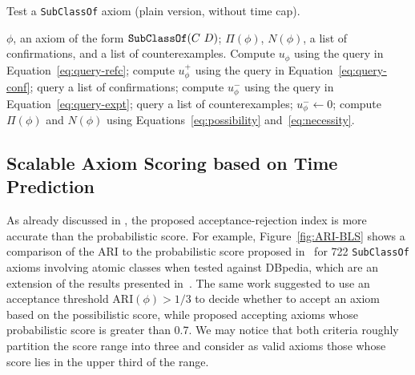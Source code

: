\documentclass{sig-alternate}
\begin{document}
\begin{algorithm}
\caption{Test a \texttt{SubClassOf} axiom\hfill\break
  (plain version, without time cap).}\label{algo:uncapped-axiom-test}
\begin{algorithmic}[1]
  \REQUIRE $\phi$, an axiom of the form $\mbox{\tt SubClassOf}(C\ D)$;
  \ENSURE $\Pi(\phi)$, $N(\phi)$, a list of confirmations, and a list of counterexamples.
  \STATE Compute $u_\phi$ using the query in Equation~\ref{eq:query-refc};
  \STATE compute $u^+_\phi$ using the query in Equation~\ref{eq:query-conf};
    \STATE query a list of confirmations;
  \ENDIF
    \STATE compute $u^-_\phi$ using the query in Equation~\ref{eq:query-expt};\label{line:count-expt}
      \STATE query a list of counterexamples;
    \ENDIF
  \ELSE
    \STATE $u^-_\phi \leftarrow 0$;
  \ENDIF
  \STATE compute $\Pi(\phi)$ and $N(\phi)$ using Equations~\ref{eq:possibility} and~\ref{eq:necessity}.
\end{algorithmic}
\end{algorithm}
\subsection{Scalable Axiom Scoring based on Time Prediction}
\label{results-no-timeout}

As already discussed in \cite{TettamanziFaronZuckerGandon2014ekaw}, the proposed
acceptance-rejection index is more accurate than the probabilistic score.
For example, Figure~\ref{fig:ARI-BLS} shows a comparison of the ARI
to the probabilistic score proposed in~\cite{BuehmannLehmann2012}
for 722 \texttt{SubClassOf} axioms involving atomic classes when tested against DBpedia,
which are an extension of the results presented in~\cite{TettamanziFaronZuckerGandon2014ekaw}.
The same work suggested to use an acceptance threshold $\mathrm{ARI}(\phi)>1/3$
to decide whether to accept an axiom based on the possibilistic score, while
\cite{BuehmannLehmann2012} proposed accepting axioms whose probabilistic score
is greater than 0.7. We may notice that both criteria roughly partition the score range
into three and consider as valid axioms those whose score lies in the upper third of the range.
\end{document}
